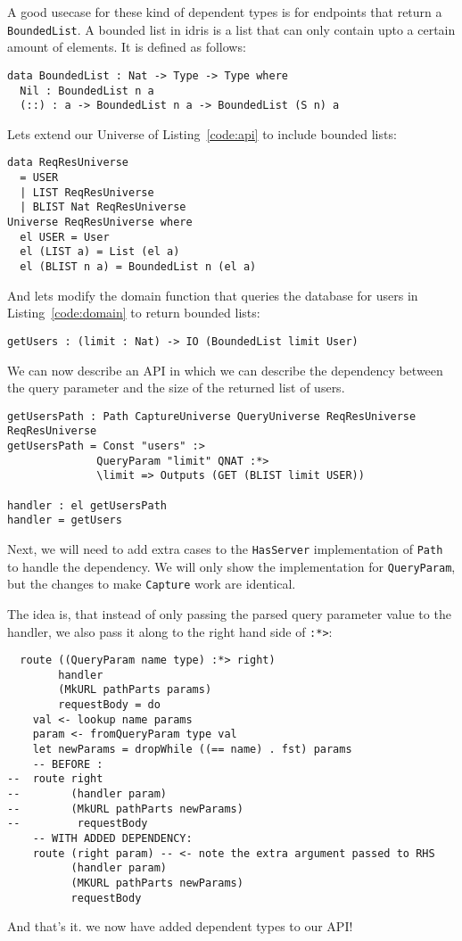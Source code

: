 \documentclass[12pt,a4paper]{article}
\begin{document}
A good usecase for these kind of dependent types is for endpoints that return a \texttt{BoundedList}.
A bounded list in idris is a list that can only contain upto a certain amount of elements. It is defined as follows:
\begin{verbatim}
data BoundedList : Nat -> Type -> Type where
  Nil : BoundedList n a
  (::) : a -> BoundedList n a -> BoundedList (S n) a
\end{verbatim}

Lets extend our Universe of Listing~\ref{code:api} to include bounded lists:
\begin{verbatim}
data ReqResUniverse
  = USER
  | LIST ReqResUniverse
  | BLIST Nat ReqResUniverse
Universe ReqResUniverse where
  el USER = User
  el (LIST a) = List (el a)
  el (BLIST n a) = BoundedList n (el a)
\end{verbatim}
And lets modify the domain function that queries the database for users
in Listing~\ref{code:domain} to return bounded lists:

\begin{verbatim}
getUsers : (limit : Nat) -> IO (BoundedList limit User)
\end{verbatim}
We can now describe an API in which we can describe the dependency between the query parameter
and the size of the returned list of users.
\begin{verbatim}
getUsersPath : Path CaptureUniverse QueryUniverse ReqResUniverse ReqResUniverse
getUsersPath = Const "users" :> 
              QueryParam "limit" QNAT :*>
              \limit => Outputs (GET (BLIST limit USER))

handler : el getUsersPath
handler = getUsers
\end{verbatim}

Next, we will need to add extra cases to the \texttt{HasServer}
implementation of \texttt{Path} to handle the dependency. We
will only show the implementation for \texttt{QueryParam},
but the changes to make \texttt{Capture} work are identical.

The idea is, that instead of only passing the parsed query parameter value
to the handler, we also pass it along to the right hand side of \texttt{:*>}:
\begin{verbatim}
  route ((QueryParam name type) :*> right)
        handler
        (MkURL pathParts params)
        requestBody = do
    val <- lookup name params
    param <- fromQueryParam type val
    let newParams = dropWhile ((== name) . fst) params
    -- BEFORE :
--  route right 
--        (handler param)
--        (MkURL pathParts newParams)
--         requestBody
    -- WITH ADDED DEPENDENCY:
    route (right param) -- <- note the extra argument passed to RHS
          (handler param)
          (MKURL pathParts newParams)
          requestBody
\end{verbatim}
And that's it. we now have added dependent types to our API!
\end{document}
